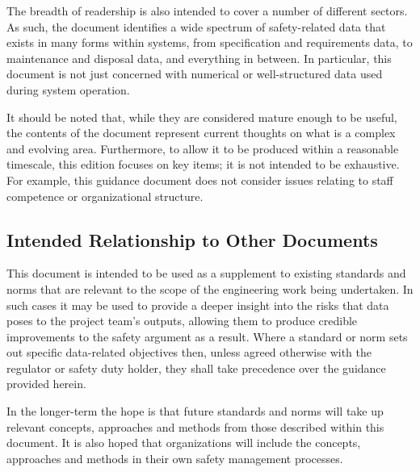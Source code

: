 The breadth of readership is also intended to cover a number of different sectors. As such, the document identifies a wide spectrum of safety-related data that exists in many forms within systems, from specification and requirements data, to maintenance and disposal data, and everything in between. In particular, this document is not just concerned with numerical or well-structured data used during system operation.

It should be noted that, while they are considered mature enough to be useful, the contents of the document represent current thoughts on what is a complex and evolving area. Furthermore, to allow it to be produced within a reasonable timescale, this edition focuses on key items; it is not intended to be exhaustive. For example, this guidance document does not consider issues relating to staff competence or organizational structure.

\subsection{Intended Relationship to Other Documents}
This document is intended to be used as a supplement to existing standards and norms that are relevant to the scope of the engineering work being undertaken. In such cases it may be used to provide a deeper insight into the risks that data poses to the project team's outputs, allowing them to produce credible improvements to the safety argument as a result. Where a standard or norm sets out specific data-related objectives then, unless agreed otherwise with the regulator or safety duty holder, they shall take precedence over the guidance provided herein.

In the longer-term the hope is that future standards and norms will take up relevant concepts, approaches and methods from those described within this document. It is also hoped that organizations will include the concepts, approaches and methods in their own safety management processes.

\clearpage %
